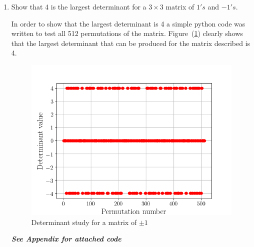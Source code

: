 \begin{enumerate}[label=\arabic*.]
    \item Show that 4 is the largest determinant for a $3 \times 3$ matrix
        of $1's$ and $-1's$.
        \begin{mdframed}[style=MyFrame]
            In order to show that the largest determinant is 4 a simple
            python code was written to test all 512 permutations of the
            matrix. Figure~(\ref{fig:det}) clearly shows that the largest
            determinant that can be produced for the matrix described is 4.
            \begin{figure}[H]
                \includegraphics[height=0.35\textheight]{../media/determinant-study.png}
                \caption{Determinant study for a matrix of $\pm 1$}
                \label{fig:det}
            \end{figure}
            \emph{\textbf{See Appendix for attached code}}
        \end{mdframed}


\end{enumerate}

